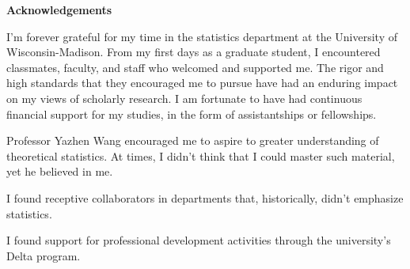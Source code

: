 \newenvironment{acknowledgements}%
    {\cleardoublepage\null\vfill\begin{center}%
    \bfseries Acknowledgements\end{center}}%
    {\vfill\null}
        \begin{acknowledgements}
I'm forever grateful for my time in the statistics department at the University of Wisconsin-Madison. From my first days as a graduate student, I encountered classmates, faculty, and staff who welcomed and supported me. The rigor and high standards that they encouraged me to pursue have had an enduring impact on my views of scholarly research. I am fortunate to have had continuous financial support for my studies, in the form of assistantships or fellowships. 

Professor Yazhen Wang encouraged me to aspire to greater understanding of theoretical statistics. At times, I didn't think that I could master such material, yet he believed in me. 

I found receptive collaborators in departments that, historically, didn't emphasize statistics. 




I found support for professional development activities through the university's Delta program.



\end{acknowledgements}